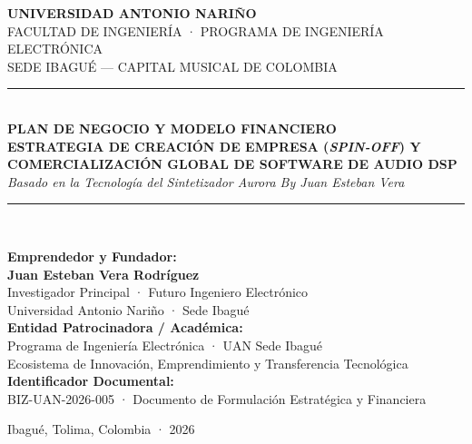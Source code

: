 \documentclass[11pt,a4paper]{article}
\begin{document}
\begin{titlepage}
    \centering
    \vspace*{0.5cm}
    
    {\scshape\LARGE \textbf{UNIVERSIDAD ANTONIO NARIÑO}}\\[0.3cm]
    {\scshape\large FACULTAD DE INGENIERÍA · PROGRAMA DE INGENIERÍA ELECTRÓNICA}\\[0.15cm]
    {\small SEDE IBAGUÉ — CAPITAL MUSICAL DE COLOMBIA}\\[1.5cm]
    
    \rule{\linewidth}{1.8pt}\\[0.4cm]
    {\Huge \bfseries \textcolor{uanblue}{PLAN DE NEGOCIO Y MODELO FINANCIERO}}\\[0.35cm]
    {\Large \bfseries ESTRATEGIA DE CREACIÓN DE EMPRESA (\textit{SPIN-OFF}) Y COMERCIALIZACIÓN GLOBAL DE SOFTWARE DE AUDIO DSP}\\[0.25cm]
    {\large \itshape Basado en la Tecnología del Sintetizador Aurora By Juan Esteban Vera}\\[0.4cm]
    \rule{\linewidth}{1.8pt}\\[2.0cm]
    
    \begin{minipage}{0.85\textwidth}
        \large
        \textbf{Emprendedor y Fundador:}\\[0.15cm]
        \textbf{Juan Esteban Vera Rodríguez}\\
        Investigador Principal · Futuro Ingeniero Electrónico\\
        Universidad Antonio Nariño · Sede Ibagué\\[0.8cm]
        
        \textbf{Entidad Patrocinadora / Académica:}\\
        Programa de Ingeniería Electrónica · UAN Sede Ibagué\\
        Ecosistema de Innovación, Emprendimiento y Transferencia Tecnológica\\[0.8cm]
        
        \textbf{Identificador Documental:}\\
        BIZ-UAN-2026-005 · Documento de Formulación Estratégica y Financiera
    \end{minipage}
    
    \vfill
    {\large Ibagué, Tolima, Colombia · 2026}
\end{titlepage}
\end{document}
